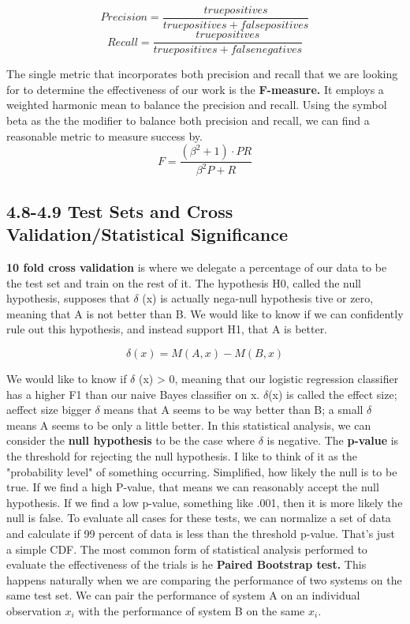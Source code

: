 \documentclass{article}
\begin{document}
\[
    Precision = \frac{true positives}{true positives + false positives}
\]
\[
    Recall = \frac{true positives}{true positives + false negatives}
\]

The single metric that incorporates both precision and recall that we are looking for to determine the effectiveness of our work is the \textbf{F-measure.} It employs
a weighted harmonic mean to balance the precision and recall. Using the symbol beta as the the modifier to balance both precision and recall, we can find a
reasonable metric to measure success by.
\[
    F = \frac{(\beta^2 +1)\cdot PR}{\beta^2P+R}
\]

\subsection{4.8-4.9 Test Sets and Cross Validation/Statistical Significance}

\textbf{10 fold cross validation} is where we delegate a percentage of our data to be the test set and train on the rest of it. The hypothesis H0, called the null hypothesis, supposes that $\delta$ (x) is actually nega-null hypothesis
tive or zero, meaning that A is not better than B. We would like to know if we can
confidently rule out this hypothesis, and instead support H1, that A is better.

\[
    \delta(x) = M(A,x) - M(B, x)
\]

We would like to know if $\delta$ (x) > 0, meaning that our logistic regression classifier
has a higher F1 than our naive Bayes classifier on x. $\delta$(x) is called the effect size; aeffect size
bigger $\delta$ means that A seems to be way better than B; a small $\delta$ means A seems to
be only a little better.
\newline
In this statistical analysis, we can consider the \textbf{null hypothesis} to be the case where $\delta$ is negative. The \textbf{p-value} is the threshold for rejecting the null hypothesis.
I like to think of it as the "probability level" of something occurring. Simplified, how likely the null is to be true. If we find a high P-value, that means we can reasonably accept the null hypothesis. If
we find a low p-value, something like .001, then it is more likely the null is false. To evaluate all cases for these tests, we can normalize a set of data and calculate if
99 percent of data is less than the threshold p-value. That's just a simple CDF. The most common form of statistical analysis performed to evaluate the effectiveness of the trials is he \textbf{Paired Bootstrap test.}
This happens naturally when we are comparing the performance of two systems on the same
test set. We can pair the performance of system A on an individual observation $x_i$
with the performance of system B on the same $x_i.$
\end{document}
